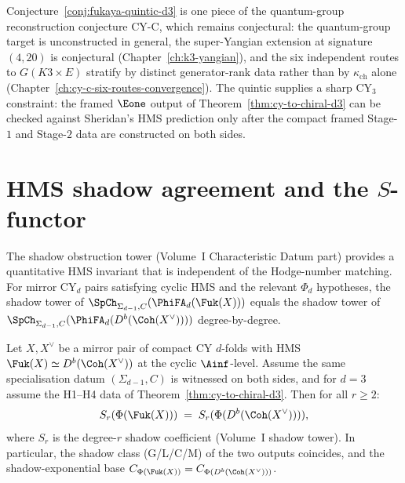 \begin{remark}
\label{rem:fukaya-quintic-cyc-honest}
Conjecture~\ref{conj:fukaya-quintic-d3} is one piece of the
quantum-group reconstruction conjecture CY-C, which remains
conjectural: the quantum-group target is unconstructed in general,
the super-Yangian extension at signature $(4,20)$ is conjectural
(Chapter~\ref{ch:k3-yangian}), and the six independent routes to
$G(K3 \times E)$ stratify by distinct generator-rank data rather
than by $\kappa_{\mathrm{ch}}$ alone
(Chapter~\ref{ch:cy-c-six-routes-convergence}). The quintic supplies a
sharp CY$_3$ constraint: the framed $\Eone$ output of
Theorem~\ref{thm:cy-to-chiral-d3} can be checked against Sheridan's
HMS prediction only after the compact framed Stage-$1$ and Stage-$2$
data are constructed on both sides.
\end{remark}


\section{HMS shadow agreement and the \texorpdfstring{$S$}{S}-functor}
\label{sec:hms-shadow-agreement}

The shadow obstruction tower (Volume~I Characteristic Datum part) provides a
quantitative HMS invariant that is independent of the Hodge-number
matching. For mirror CY$_d$ pairs satisfying cyclic HMS and the
relevant $\Phi_d$ hypotheses, the shadow tower of
$\SpCh_{\Sigma_{d-1}, C}(\PhiFA_d(\Fuk(X)))$ equals the shadow tower
of $\SpCh_{\Sigma_{d-1}, C}(\PhiFA_d(D^b(\Coh(X^\vee))))$
degree-by-degree.

\begin{proposition}
\label{prop:hms-shadow-agreement}
Let $X, X^\vee$ be a mirror pair of compact CY $d$-folds with HMS
$\Fuk(X) \simeq D^b(\Coh(X^\vee))$ at the cyclic $\Ainf$-level.
Assume the same specialisation datum $(\Sigma_{d-1},C)$ is witnessed
on both sides, and for $d=3$ assume the H1--H4 data of
Theorem~\ref{thm:cy-to-chiral-d3}. Then for all $r \geq 2$:
\[
 S_r(\Phi(\Fuk(X))) \;=\; S_r(\Phi(D^b(\Coh(X^\vee)))),
\]
where $S_r$ is the degree-$r$ shadow coefficient
(Volume~I shadow tower). In particular, the shadow class
(G/L/C/M) of the two outputs coincides, and the
shadow-exponential base
$C_{\Phi(\Fuk(X))} = C_{\Phi(D^b(\Coh(X^\vee)))}$.
\end{proposition}

